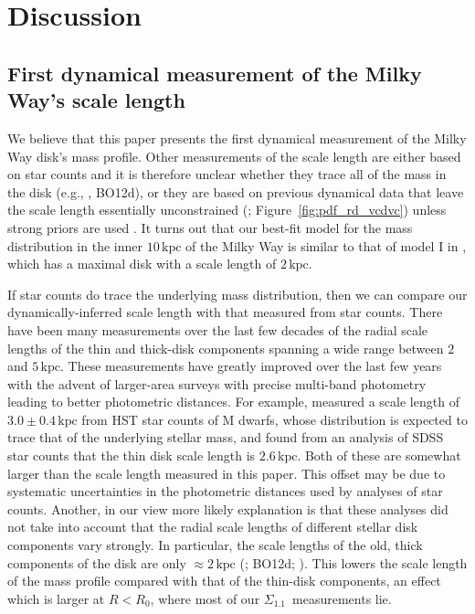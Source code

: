 \documentclass{emulateapj}
\newcommand{\eg}{e.g.}
\renewcommand{\figurename}{Figure}
\newcommand{\kpc}{\ensuremath{\,\mathrm{kpc}}}
\newcommand{\sigoneone}{\ensuremath{\Sigma_{1.1}}}
\newcommand{\bo}{BO12}
\begin{document}
\section{Discussion}\label{sec:discuss}

\subsection{First dynamical measurement of the Milky Way's scale length}

We believe that this paper presents the first dynamical measurement of
the Milky Way disk's mass profile. Other measurements of the scale
length are either based on star counts and it is therefore unclear
whether they trace all of the mass in the disk (e.g.,
\citealt{Juric08a}, \bo d), or they are based on previous dynamical
data that leave the scale length essentially unconstrained
(\citealt{Dehnen98a}; \figurename~\ref{fig:pdf_rd_vcdvc}) unless
strong priors are used \citep[\eg,][]{McMillan11a}. It turns out that
our best-fit model for the mass distribution in the inner $10\kpc$ of
the Milky Way is similar to that of model I in \citet{binneytremaine},
which has a maximal disk with a scale length of $2\kpc$.

If star counts do trace the underlying mass distribution, then we can
compare our dynamically-inferred scale length with that measured from
star counts. There have been many measurements over the last few
decades of the radial scale lengths of the thin and thick-disk
components spanning a wide range between $2$ and $5\kpc$. These
measurements have greatly improved over the last few years with the
advent of larger-area surveys with precise multi-band photometry
leading to better photometric distances. For example, \citet{Gould96a}
measured a scale length of $3.0\pm0.4\kpc$ from HST star counts of M
dwarfs, whose distribution is expected to trace that of the underlying
stellar mass, and \citet{Juric08a} found from an analysis of SDSS star
counts that the thin disk scale length is $2.6\kpc$. Both of these are
somewhat larger than the scale length measured in this paper. This
offset may be due to systematic uncertainties in the photometric
distances used by analyses of star counts.  Another, in our view more
likely explanation is that these analyses did not take into account
that the radial scale lengths of different stellar disk components
vary strongly. In particular, the scale lengths of the old, thick
components of the disk are only $\approx2\kpc$ (\citealt{Bensby11a};
\bo d; \citealt{Cheng12a}). This lowers the scale length of the mass
profile compared with that of the thin-disk components, an effect
which is larger at $R < R_0$, where most of our
\sigoneone\ measurements lie.
\end{document}
